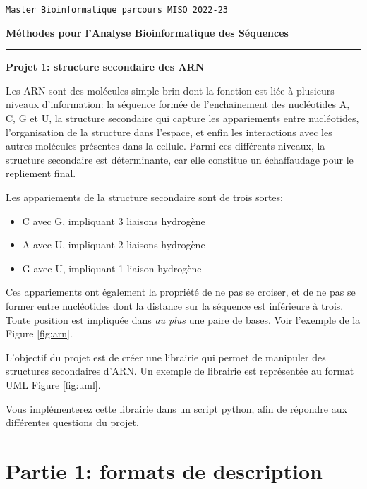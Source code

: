 \documentclass[10pt]{article}
\begin{document}
{\flushright \small \tt Master Bioinformatique parcours MISO 2022-23}

\begin{center}
\textbf{M\'ethodes pour l'Analyse Bioinformatique des S\'equences}

\end{center}


\hrule

\bigskip

\begin{center}

\textbf{\Large Projet 1: structure secondaire des ARN}    
\end{center}

\bigskip

Les ARN sont des mol\'ecules simple brin dont la fonction est li\'ee \`a plusieurs niveaux d’information: la s\'equence form\'ee de l’enchainement des nucl\'eotides A, C, G et U, la structure secondaire qui capture les appariements entre nucl\'eotides, l’organisation de la structure dans l’espace, et enfin les interactions avec les autres mol\'ecules pr\'esentes dans la cellule. Parmi ces diff\'erents niveaux, la structure secondaire est d\'eterminante, car elle constitue un \'echaffaudage pour le repliement final.

Les appariements de la structure secondaire sont de trois sortes:
\begin{itemize}
\item C avec G, impliquant 3 liaisons hydrogène
\item  A avec U, impliquant 2 liaisons hydrogène
\item G avec U, impliquant 1 liaison hydrogène
\end{itemize}

Ces appariements ont également la propriété de ne pas se croiser, et de ne pas se former entre nucléotides dont la distance sur la séquence est inférieure à trois. Toute position est impliquée dans \emph{au plus} une paire de bases.  Voir l'exemple de la Figure \ref{fig:arn}.

L'objectif du projet est de créer une librairie qui permet de manipuler des structures secondaires d'ARN. Un exemple de librairie est représentée au format UML Figure \ref{fig:uml}.

Vous implémenterez cette librairie dans un script python, afin de répondre aux différentes questions du projet.



\section*{Partie 1: formats de description}
\end{document}
